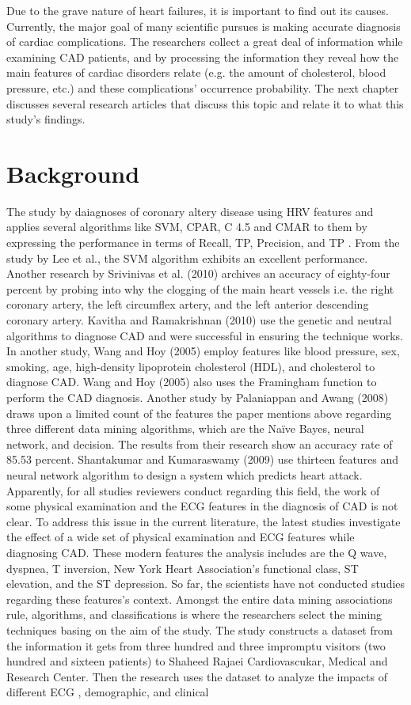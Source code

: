 \documentclass[sigconf]{acmart}
\begin{document}
Due to the grave nature of heart failures, it is important to find out its causes. Currently, the major goal of many scientific pursues is making accurate diagnosis of cardiac complications. The researchers collect a great deal of information while examining CAD patients, and by processing the information they reveal how the main features of cardiac disorders relate (e.g. the amount of cholesterol, blood pressure, etc.) and these complications’ occurrence probability. The next chapter discusses several research articles that discuss this topic and relate it to what this study’s findings.


\section{Background}

 The study by  \cite{ali} daiagnoses of coronary altery disease using HRV features and applies several algorithms like SVM, CPAR, C 4.5 and CMAR to them by expressing the performance in terms of Recall, TP, Precision, and TP \citep{ali}. From the study by Lee et al., the SVM algorithm exhibits an excellent performance. Another research by Srivinivas et al. (2010) archives an accuracy of eighty-four percent by probing into why the clogging of the main heart vessels i.e. the right coronary artery, the left circumflex artery, and the left anterior descending coronary artery.	Kavitha and Ramakrishnan (2010) use the genetic and neutral algorithms to diagnose CAD and were successful in ensuring the technique works. In another study, Wang and Hoy (2005) employ features like blood pressure, sex, smoking, age, high-density lipoprotein cholesterol (HDL), and cholesterol to diagnose CAD. Wang and Hoy (2005) also uses the Framingham function to perform the CAD diagnosis.  Another study by Palaniappan and Awang (2008) draws upon a limited count of the features the paper mentions above regarding three different data mining algorithms, which are the Naïve Bayes, neural network, and decision. The results from their research show an accuracy rate of 85.53 percent. Shantakumar and Kumaraswamy (2009) use thirteen features and neural network algorithm to design a system which predicts heart attack.	Apparently, for all studies reviewers conduct regarding this field, the work of some physical examination and the ECG features in the diagnosis of CAD is not clear.  To address this issue in the current literature, the latest studies investigate the effect of a wide set of physical examination and ECG features while diagnosing CAD. These modern features the analysis includes are the Q wave, dyspnea, T inversion, New York Heart Association’s functional class,  ST elevation, and the ST depression. So far, the scientists have not conducted studies regarding these features’s context. Amongst the entire data mining associations rule, algorithms, and classifications is where the researchers select the mining techniques basing on the aim of the study. The study constructs a dataset from the information it gets from three hundred and three impromptu visitors (two hundred and sixteen patients) to Shaheed Rajaei Cardiovascukar, Medical and Research Center. Then the research uses the dataset to analyze the impacts of different ECG , demographic, and clinical 
\end{document}
